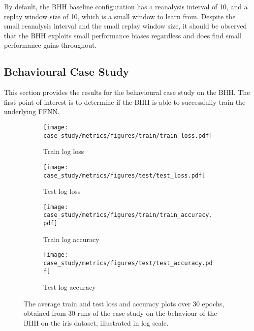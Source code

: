 By default, the \acs{BHH} baseline configuration has a reanalysis interval of 10, and a replay window size of 10, which is a small window to learn from. Despite the small reanalysis interval and the small replay window size, it should be observed that the \acs{BHH} exploits small performance biases regardless and does find small performance gains throughout.

\subsection{Behavioural Case Study}\label{sec:results:case_study}

This section provides the results for the behavioural case study on the \acs{BHH}. The first point of interest is to determine if the \acs{BHH} is able to successfully train the underlying \acs{FFNN}.

\begin{figure}[H]
	\begin{subfigure}{0.5\textwidth}
		\centering
		\texttt{[image: case\_study/metrics/figures/train/train\_loss.pdf]}
		\caption{Train log loss}
		\label{fig:results:case_study:metrics:train_loss}
	\end{subfigure}
	\begin{subfigure}{0.5\textwidth}
		\centering
		\texttt{[image: case\_study/metrics/figures/test/test\_loss.pdf]}
		\caption{Test log loss}
		\label{fig:results:case_study:metrics:test_loss}
	\end{subfigure}
	\par\bigskip
	\begin{subfigure}{0.5\textwidth}
		\centering
		\texttt{[image: case\_study/metrics/figures/train/train\_accuracy.pdf]}
		\caption{Train log accuracy}
		\label{fig:results:case_study:metrics:train_accuracy}
	\end{subfigure}
	\begin{subfigure}{0.5\textwidth}
		\centering
		\texttt{[image: case\_study/metrics/figures/test/test\_accuracy.pdf]}
		\caption{Test log accuracy}
		\label{fig:results:case_study:metrics:test_accuracy}
	\end{subfigure}
	\par\bigskip
	\caption{The average train and test loss and accuracy plots over 30 epochs, obtained from 30 runs of the case study on the behaviour of the \acs{BHH} on the iris dataset, illustrated in log scale.}
	\label{fig:results:case_study:metrics}
\end{figure}

